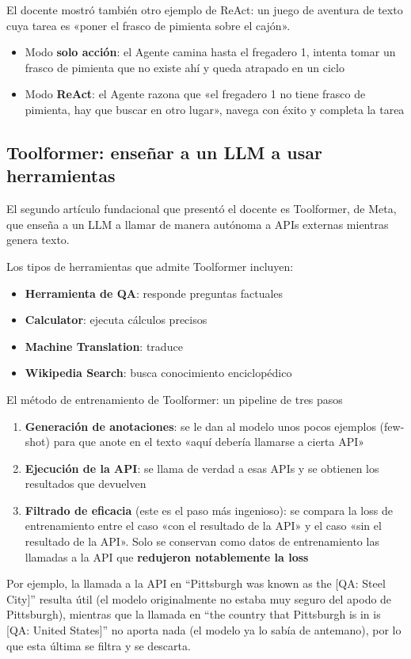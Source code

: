 \documentclass[a4paper]{article}
\begin{document}
El docente mostró también otro ejemplo de ReAct: un juego de aventura de texto cuya tarea es «poner el frasco de pimienta sobre el cajón».

\begin{itemize}
    \item Modo \textbf{solo acción}: el Agente camina hasta el fregadero 1, intenta tomar un frasco de pimienta que no existe ahí y queda atrapado en un ciclo
    \item Modo \textbf{ReAct}: el Agente razona que «el fregadero 1 no tiene frasco de pimienta, hay que buscar en otro lugar», navega con éxito y completa la tarea
\end{itemize}

\subsection{Toolformer: enseñar a un LLM a usar herramientas}

El segundo artículo fundacional que presentó el docente es Toolformer, de Meta, que enseña a un LLM a llamar de manera autónoma a APIs externas mientras genera texto.

Los tipos de herramientas que admite Toolformer incluyen:
\begin{itemize}
    \item \textbf{Herramienta de QA}: responde preguntas factuales
    \item \textbf{Calculator}: ejecuta cálculos precisos
    \item \textbf{Machine Translation}: traduce
    \item \textbf{Wikipedia Search}: busca conocimiento enciclopédico
\end{itemize}

\begin{knowledgebox}{El método de entrenamiento de Toolformer: un pipeline de tres pasos}
\begin{enumerate}
    \item \textbf{Generación de anotaciones}: se le dan al modelo unos pocos ejemplos (few-shot) para que anote en el texto «aquí debería llamarse a cierta API»
    \item \textbf{Ejecución de la API}: se llama de verdad a esas APIs y se obtienen los resultados que devuelven
    \item \textbf{Filtrado de eficacia} (este es el paso más ingenioso): se compara la loss de entrenamiento entre el caso «con el resultado de la API» y el caso «sin el resultado de la API». Solo se conservan como datos de entrenamiento las llamadas a la API que \textbf{redujeron notablemente la loss}
\end{enumerate}
Por ejemplo, la llamada a la API en ``Pittsburgh was known as the {[}QA: Steel City{]}'' resulta útil (el modelo originalmente no estaba muy seguro del apodo de Pittsburgh), mientras que la llamada en ``the country that Pittsburgh is in is {[}QA: United States{]}'' no aporta nada (el modelo ya lo sabía de antemano), por lo que esta última se filtra y se descarta.
\end{knowledgebox}
\end{document}
